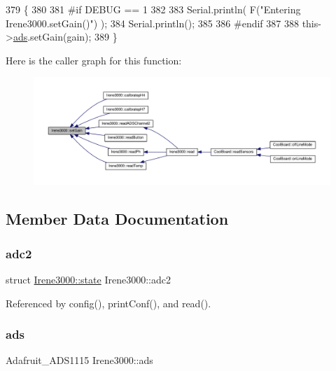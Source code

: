 \begin{DoxyCode}
379 \{
380 
381 \textcolor{preprocessor}{#if DEBUG == 1  }
382 
383     Serial.println( F(\textcolor{stringliteral}{"Entering Irene3000.setGain()"}) );
384     Serial.println();
385 
386 \textcolor{preprocessor}{#endif}
387 
388     this->\hyperlink{classIrene3000_a1215e77ba761c9908d80d691f149e135}{ads}.setGain(gain);
389 \}
\end{DoxyCode}
Here is the caller graph for this function\+:\nopagebreak
\begin{figure}[H]
\begin{center}
\leavevmode
\includegraphics[width=350pt]{classIrene3000_aff7c5da186b388e7272e63ff88a20c34_icgraph}
\end{center}
\end{figure}


\subsection{Member Data Documentation}
\mbox{\label{classIrene3000_aae3a95a1c83c766cd2f299ce471c337e}} 
\subsubsection{\texorpdfstring{adc2}{adc2}}
{\footnotesize\ttfamily struct \hyperlink{structIrene3000_1_1state}{Irene3000\+::state} Irene3000\+::adc2\hspace{0.3cm}{\ttfamily [private]}}



Referenced by config(), print\+Conf(), and read().

\mbox{\label{classIrene3000_a1215e77ba761c9908d80d691f149e135}} 
\subsubsection{\texorpdfstring{ads}{ads}}
{\footnotesize\ttfamily Adafruit\+\_\+\+A\+D\+S1115 Irene3000\+::ads\hspace{0.3cm}{\ttfamily [private]}}



